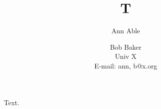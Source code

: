 \documentclass{article}
\title{T}\author{Ann Able \and Bob Baker\\ Univ X\\ E-mail: ann, b@x.org}
\begin{document}
\maketitle
Text.
\end{document}
